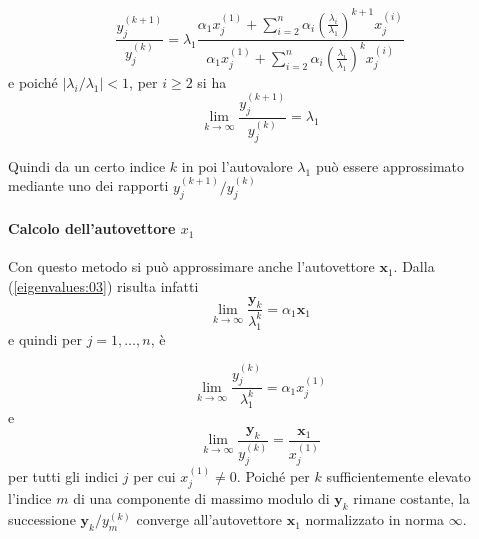 \begin{equation}
\label{eigenvalues:06}
\frac{y_j^{(k+1)}}{y_j^{(k)}} =
 \lambda_1
\frac{\alpha_1 x_j^{(1)} + \displaystyle \sum_{i=2}^{n} \alpha_i
\left( \frac{\lambda_i}{\lambda_1} \right)^{k+1} x_j^{(i)}
}{\alpha_1 x_j^{(1)} + \displaystyle \sum_{i=2}^{n} \alpha_i
\left( \frac{\lambda_i}{\lambda_1} \right)^{k} x_j^{(i)}
}
\end{equation}
e poich\'e $|\lambda_i / \lambda_1| < 1 $, per $i \geq 2$ si ha
$$ \lim_{k \to \infty}  \dfrac{y_j^{(k+1)}}{y_j^{(k)}} =  \lambda_1 $$

Quindi da un certo indice $k$ in poi l'autovalore $\lambda_1$ pu\`o
essere approssimato mediante uno dei rapporti
$y_j^{(k+1)} / y_j^{(k)}$ 


\paragraph{Calcolo dell'autovettore $x_1$}
Con questo metodo si pu\`o approssimare anche l'autovettore $\mathbf{x}_1$.
Dalla (\ref{eigenvalues:03}) risulta infatti
$$
\lim_{k \to \infty} \dfrac{\mathbf{y}_k}{\lambda_1^{k}} = \alpha_1 \mathbf{x}_1
$$
e quindi per $j=1, \ldots, n$, \`e

$$
\lim_{k \to \infty} \dfrac{y_j^{(k)}}{\lambda_1^{k}} = \alpha_1 x_j^{(1)}
$$
e
\begin{equation}
  \label{eigenvalues:04}
  \lim_{k \to \infty} \dfrac{\mathbf{y}_k}{y_j^{(k)}} =  \dfrac{\mathbf{x}_1}{x_j^{(1)}}
\end{equation}
per tutti gli indici $j$ per cui $x_j^{(1)} \neq 0$. Poich\'e per $k$
sufficientemente elevato l'indice $m$ di una componente di massimo modulo di
$\mathbf{y}_k$ rimane costante, la successione $\mathbf{y}_k / y_m^{(k)}$ converge
all'autovettore $\mathbf{x}_1$ normalizzato in norma $\infty$.

